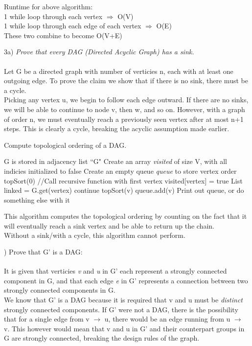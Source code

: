 \documentclass[12pt]{article}
\begin{document}
\noindent Runtime for above algorithm: \\
1 while loop through each vertex $\Rightarrow$ O(V)\\
1 while loop through each edge of each vertex $\Rightarrow$ O(E)\\
These two combine to become O(V+E)



\pagebreak


\noindent 3a) \textit{Prove that every DAG (Directed Acyclic Graph) has a sink.}\\\\
Let G be a directed graph with number of verticies n, each with at least one outgoing edge. To prove the claim we show that if there is no sink, there must be a cycle. \\
Picking any vertex u, we begin to follow each edge outward. If there are no sinks, we will be able to continue to node v, then w, and so on. However, with a graph of order n, we must eventually reach a previously seen vertex after at most n+1 steps. This is clearly a cycle, breaking the acyclic assumption made earlier.

\begin{algorithm}[H]
\caption{Compute topological ordering of a DAG.}
\begin{algorithmic}
\Require G is stored in adjacency list ``G"
\State Create an array \textit{visited} of size V, with all indicies initialized to false
\State Create an empty queue \textit{queue} to store vertex order
\State
\State topSort(0) //Call recursive function with first vertex
\State
{}
\State visited[vertex] = true
\State List linked = G.get(vertex)
\State
{}
\State continue
\EndIf
\State
\State topSort(v)
\State
\State queue.add(v)
\EndFor
\EndFunction
\State
\State Print out queue, or do something else with it
\end{algorithmic}
\end{algorithm}
\noindent This algorithm computes the topological ordering by counting on the fact that it will eventually reach a sink vertex and be able to return up the chain.\\
Without a sink/with a cycle, this algorithm cannot perform.

\pagebreak

) Prove that G' is a DAG:\\\\
\noindent It is given that verticies \textit{v} and \textit{u} in G' each represent a strongly connected component in G, and that each edge \textit{e} in G' represents a connection between two strongly connected components in G.\\
We know that G' is a DAG because it is required that v and u must be \textit{distinct} strongly connected components. If G' were not a DAG, there is the possibility that for a single edge from v $\to$ u, there would be an edge running from u $\to$ v. This however would mean that v and u in G' and their counterpart groups in G are strongly connected, breaking the design rules of the graph.


\end{document}
